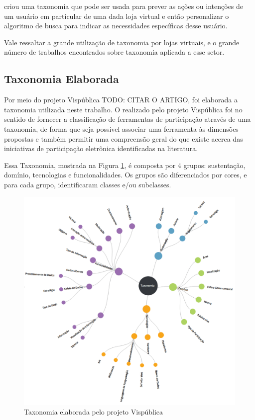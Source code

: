\par
{} criou uma taxonomia que pode ser usada para prever as ações ou intenções de um usuário em particular de uma dada loja virtual
e então personalizar o algoritmo de busca para indicar as necessidades específicas desse usuário.

\par
Vale ressaltar a grande utilização de taxonomia por lojas virtuais, e o grande número de trabalhos encontrados sobre taxonomia aplicada a esse setor.

\subsection{Taxonomia Elaborada}
\label{subsec:taxonomiaElaborada}
\par
Por meio do projeto Vispública TODO: CITAR O ARTIGO, foi elaborada a taxonomia utilizada neste trabalho. O realizado pelo projeto Vispública foi no sentido de fornecer
a classificação de ferramentas de participação através de uma taxonomia, de forma que seja possível associar uma ferramenta às dimensões propostas e também permitir
uma compreensão geral do que existe acerca das iniciativas de participação eletrônica identificadas na literatura.

\par
Essa Taxonomia, mostrada na Figura \ref{fig:taxonomia-vispublica}, é composta por 4 grupos: sustentação, domínio, tecnologias e funcionalidades.
Os grupos são diferenciados por cores, e para cada grupo, identificaram classes e/ou subclasses.

\begin{figure}[!ht]
    \centering
    \includegraphics[scale=0.30]{./figuras/taxonopart-radial.png}
    \caption{Taxonomia elaborada pelo projeto Vispública}
    \label{fig:taxonomia-vispublica}
\end{figure}


